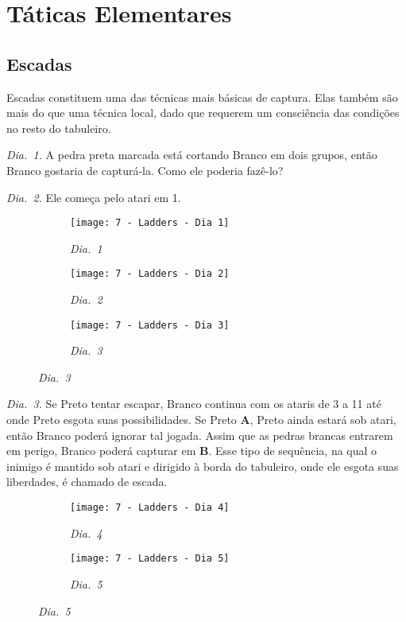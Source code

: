 \chapter{Táticas Elementares}

\section{Escadas}

Escadas constituem uma das técnicas mais básicas de captura. Elas também são mais do que uma técnica local, dado que requerem um consciência das condições no resto do tabuleiro.

\emph{Dia.\@~1.} A pedra preta marcada está cortando Branco em dois grupos, então Branco gostaria de capturá-la. Como ele poderia fazê-lo?

\emph{Dia.\@~2.} Ele começa pelo atari em 1.

\begin{figure}[h!]
    \centering
    \begin{subfigure}[t]{.3\textwidth}
        \centering
        \texttt{[image: 7 - Ladders - Dia 1]}
        \caption*{\emph{Dia.\@~1}}
    \end{subfigure}
    \hfill
    \begin{subfigure}[t]{.3\textwidth}
        \centering
        \texttt{[image: 7 - Ladders - Dia 2]}
        \caption*{\emph{Dia.\@~2}}
    \end{subfigure}
    \hfill
    \begin{subfigure}[t]{.3\textwidth}
        \centering
        \texttt{[image: 7 - Ladders - Dia 3]}
        \caption*{\emph{Dia.\@~3}}
    \end{subfigure}
\end{figure}

\emph{Dia.\@~3.} Se Preto tentar escapar, Branco continua com os ataris de 3 a 11 até onde Preto esgota suas possibilidades. Se Preto \textbf{A}, Preto ainda estará sob atari, então Branco poderá ignorar tal jogada. Assim que as pedras brancas entrarem em perigo, Branco poderá capturar em \textbf{B}. Esse tipo de sequência, na qual o inimigo é mantido sob atari e dirigido à borda do tabuleiro, onde ele esgota suas liberdades, é chamado de escada.

\begin{figure}[h!]
    \centering
    \begin{subfigure}[t]{.3\textwidth}
        \centering
        \texttt{[image: 7 - Ladders - Dia 4]}
        \caption*{\emph{Dia.\@~4}}
    \end{subfigure}
    \hspace{1cm}
    \begin{subfigure}[t]{.3\textwidth}
        \centering
        \texttt{[image: 7 - Ladders - Dia 5]}
        \caption*{\emph{Dia.\@~5}}
    \end{subfigure}
\end{figure}

